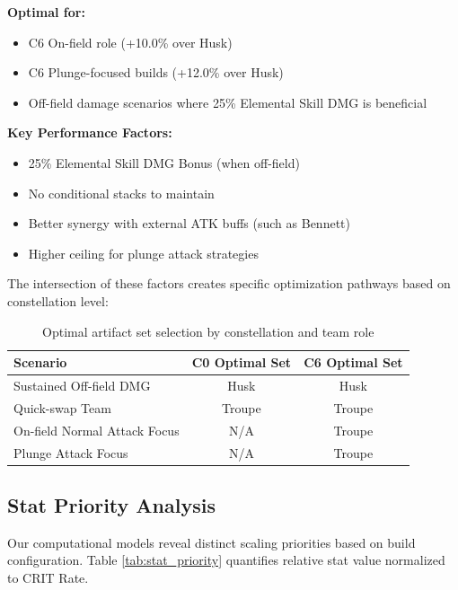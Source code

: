 \documentclass[12pt,a4paper]{article}
\begin{document}
\begin{tcolorbox}[colback=troupecolor!5, colframe=troupecolor, title=Golden Troupe (4pc)]
\textbf{Optimal for:}
\begin{itemize}
    \item C6 On-field role (+10.0\% over Husk)
    \item C6 Plunge-focused builds (+12.0\% over Husk)
    \item Off-field damage scenarios where 25\% Elemental Skill DMG is beneficial
\end{itemize}

\textbf{Key Performance Factors:}
\begin{itemize}
    \item 25\% Elemental Skill DMG Bonus (when off-field)
    \item No conditional stacks to maintain
    \item Better synergy with external ATK buffs (such as Bennett)
    \item Higher ceiling for plunge attack strategies
\end{itemize}
\end{tcolorbox}

The intersection of these factors creates specific optimization pathways based on constellation level:

\begin{table}[h]
\centering
\begin{tabular}{lcc}
\toprule
\textbf{Scenario} & \textbf{C0 Optimal Set} & \textbf{C6 Optimal Set} \\
\midrule
Sustained Off-field DMG & Husk & Husk \\
Quick-swap Team & Troupe & Troupe \\
On-field Normal Attack Focus & N/A & Troupe \\
Plunge Attack Focus & N/A & Troupe \\
\bottomrule
\end{tabular}
\caption{Optimal artifact set selection by constellation and team role}
\label{tab:artifact_selection}
\end{table}

\subsection{Stat Priority Analysis}

Our computational models reveal distinct scaling priorities based on build configuration. Table \ref{tab:stat_priority} quantifies relative stat value normalized to CRIT Rate.
\end{document}
